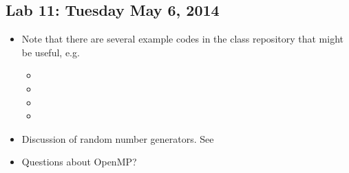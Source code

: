\documentclass[letterpaper,10pt,english]{sphinxmanual}
\begin{document}
\subsection{Lab 11: Tuesday May 6, 2014}
\label{labs/lab11:lab-11-tuesday-may-6-2014}\label{labs/lab11::doc}\label{labs/lab11:lab11}\begin{itemize}
\item {} 
Note that there are several example codes in the class repository that
might be useful, e.g.
\begin{itemize}
\item {} 

\item {} 

\item {} 

\item {} 

\end{itemize}

\item {} 
Discussion of random number generators.
See 

\item {} 
Questions about OpenMP?

\end{itemize}
\end{document}
